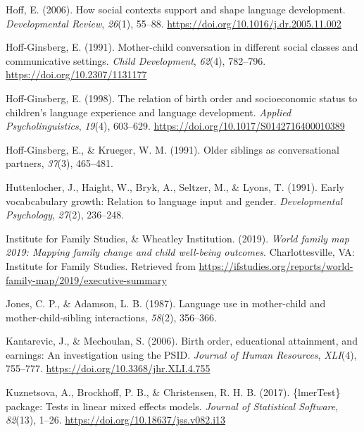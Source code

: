 \documentclass[
  english,
  man,floatsintext]{apa6}
\newlength{\cslhangindent}
\newlength{\cslentryspacingunit} %
\newenvironment{CSLReferences}[2] %
 {%
  \setlength{\parindent}{0pt}
  \ifodd #1
  \let\oldpar\par
  \def\par{\hangindent=\cslhangindent\oldpar}
  \fi
  \setlength{\parskip}{#2\cslentryspacingunit}
 }%
 {}
\begin{document}
\begin{CSLReferences}{1}{0}
\leavevmode{}%
Hoff, E. (2006). How social contexts support and shape language development. \emph{Developmental Review}, \emph{26}(1), 55--88. \url{https://doi.org/10.1016/j.dr.2005.11.002}

\leavevmode{}%
Hoff-Ginsberg, E. (1991). Mother-child conversation in different social classes and communicative settings. \emph{Child Development}, \emph{62}(4), 782--796. \url{https://doi.org/10.2307/1131177}

\leavevmode{}%
Hoff-Ginsberg, E. (1998). The relation of birth order and socioeconomic status to children's language experience and language development. \emph{Applied Psycholinguistics}, \emph{19}(4), 603--629. \url{https://doi.org/10.1017/S0142716400010389}

\leavevmode{}%
Hoff-Ginsberg, E., \& Krueger, W. M. (1991). Older siblings as conversational partners, \emph{37}(3), 465--481.

\leavevmode{}%
Huttenlocher, J., Haight, W., Bryk, A., Seltzer, M., \& Lyons, T. (1991). Early vocabcabulary growth: Relation to language input and gender. \emph{Developmental Psychology}, \emph{27}(2), 236--248.

\leavevmode{}%
Institute for Family Studies, \& Wheatley Institution. (2019). \emph{World family map 2019: Mapping family change and child well-being outcomes}. Charlottesville, {VA}: Institute for Family Studies. Retrieved from \url{https://ifstudies.org/reports/world-family-map/2019/executive-summary}

\leavevmode{}%
Jones, C. P., \& Adamson, L. B. (1987). Language use in mother-child and mother-child-sibling interactions, \emph{58}(2), 356--366.

\leavevmode{}%
Kantarevic, J., \& Mechoulan, S. (2006). Birth order, educational attainment, and earnings: An investigation using the {PSID}. \emph{Journal of Human Resources}, \emph{{XLI}}(4), 755--777. \url{https://doi.org/10.3368/jhr.XLI.4.755}

\leavevmode{}%
Kuznetsova, A., Brockhoff, P. B., \& Christensen, R. H. B. (2017). \{{lmerTest}\} package: Tests in linear mixed effects models. \emph{Journal of Statistical Software}, \emph{82}(13), 1--26. \url{https://doi.org/10.18637/jss.v082.i13}


\end{CSLReferences}
\end{document}
